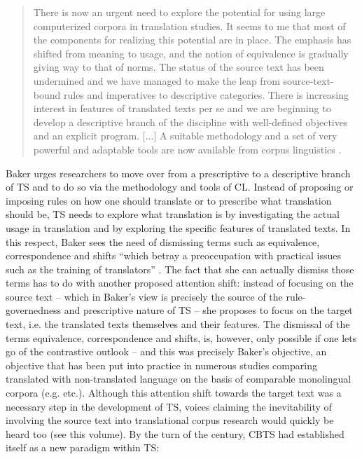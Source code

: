 \begin{quote}
There is now an urgent need to explore the potential for using large computerized corpora in translation studies. It seems to me that most of the components for realizing this potential are in place. The emphasis has shifted from meaning to usage, and the notion of equivalence is gradually giving way to that of norms. The status of the source text has been undermined and we have managed to make the leap from source-text-bound rules and imperatives to descriptive categories. There is increasing interest in features of translated texts per se and we are beginning to develop a descriptive branch of the discipline with well-defined objectives and an explicit program. [...] A suitable methodology and a set of very powerful and adaptable tools are now available from corpus linguistics \citep[248]{baker_corpus_1993}.
\end{quote}

Baker urges researchers to move over from a prescriptive to a descriptive branch of TS and to do so via the methodology and tools of CL. Instead of proposing or imposing rules on how one should translate or to prescribe what translation should be, TS needs to explore what translation is by investigating the actual usage in translation and by exploring the specific features of translated texts. In this respect, Baker sees the need of dismissing terms such as equivalence, correspondence and shifts “which betray a preoccupation with practical issues such as the training of translators” \citep[235]{baker_corpus_1993}. The fact that she can actually dismiss those terms has to do with another proposed attention shift: instead of focusing on the source text – which in Baker’s view is precisely the source of the rule-governedness and prescriptive nature of TS – she proposes to focus on the target text, i.e. the translated texts themselves and their features. The dismissal of the terms equivalence, correspondence and shifts, is, however, only possible if one lets go of the contrastive outlook – and this was precisely Baker’s objective, an objective that has been put into practice in numerous studies comparing translated with non-translated language on the basis of comparable monolingual corpora (e.g. \citealt{laviosa_core_1998,olohan_reporting_2000,mutesayire_apposition_2004,xiao_how_2010} etc.). Although this attention shift towards the target text was a necessary step in the development of TS, voices claiming the inevitability of involving the source text into translational corpus research would quickly be heard too (see this volume). By the turn of the century, CBTS had established itself as a new paradigm within TS:

